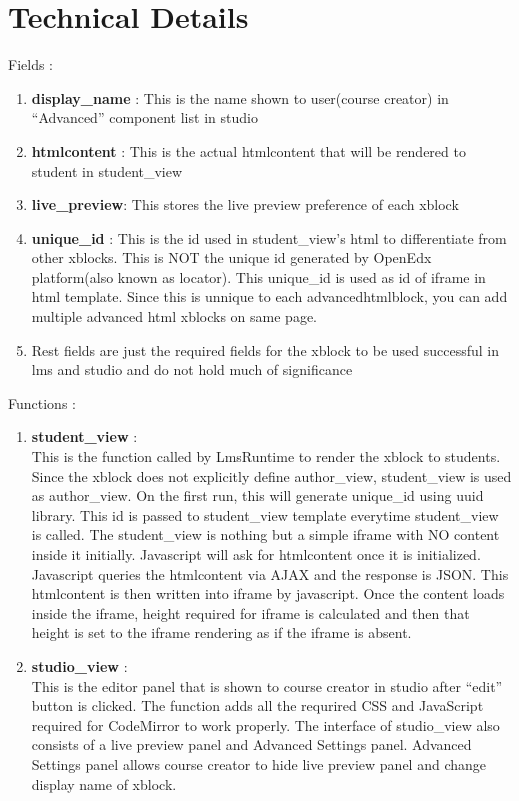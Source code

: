 \section{Technical Details}
Fields :
\begin{enumerate}
\item \textbf{display\_name} : This is the name shown to user(course creator) in “Advanced” component
list in studio
\item \textbf{htmlcontent} : This is the actual htmlcontent that will be rendered to student in student\_view
\item \textbf{live\_preview}: This stores the live preview preference of each xblock
\item \textbf{unique\_id} : This is the id used in student\_view’s html to differentiate from other xblocks.
This is NOT the unique id generated by OpenEdx platform(also known as locator). This
unique\_id is used as id of iframe in html template. Since this is unnique to each
advancedhtmlblock, you can add multiple advanced html xblocks on same page.
\item Rest fields are just the required fields for the xblock to be used successful in lms and studio
and do not hold much of significance
\end{enumerate}
Functions :
\begin{enumerate}
\item \textbf{student\_view} : \\
This is the function called by LmsRuntime to render the xblock to students.
Since the xblock does not explicitly define author\_view, student\_view is used as
author\_view. On the first run, this will generate unique\_id using uuid library. This id is
passed to student\_view template everytime student\_view is called. The student\_view is
nothing but a simple iframe with NO content inside it initially. Javascript will ask for
htmlcontent once it is initialized. Javascript queries the htmlcontent via AJAX and the
response is JSON. This htmlcontent is then written into iframe by javascript. Once the
content loads inside the iframe, height required for iframe is calculated and then that height
is set to the iframe rendering as if the iframe is absent.
\item \textbf{studio\_view} : \\
This is the editor panel that is shown to course creator in studio after “edit”
button is clicked. The function adds all the requrired CSS and JavaScript required for
CodeMirror to work properly. The interface of studio\_view also consists of a live preview
panel and Advanced Settings panel. Advanced Settings panel allows course creator to hide
live preview panel and change display name of xblock.
\end{enumerate}

